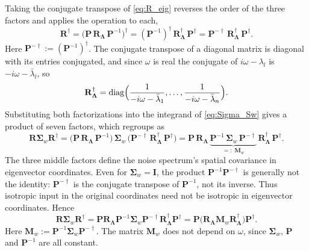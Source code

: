 \documentclass[12pt]{article}
\newcommand{\RL}{\mathbf{R}_{\boldsymbol{\Lambda}}}
\begin{document}
Taking the conjugate transpose of \eqref{eq:R_eig} reverses the order of the three factors and applies the operation to each,
\begin{equation}
    \mathbf{R}^{\dagger}=\bigl(\mathbf{P}\,\RL\,\mathbf{P}^{-1}\bigr)^{\dagger}
    =(\mathbf{P}^{-1})^{\dagger}\,\RL^{\dagger}\,\mathbf{P}^{\dagger}
    =\mathbf{P}^{-\dagger}\,\RL^{\dagger}\,\mathbf{P}^{\dagger}.
    \label{eq:Rdag_eig}
\end{equation}
Here $\mathbf{P}^{-\dagger}:=(\mathbf{P}^{-1})^{\dagger}$.
The conjugate transpose of a diagonal matrix is diagonal with its entries conjugated, and since $\omega$ is real the conjugate of
$i\omega-\lambda_l$ is $-i\omega-\bar\lambda_l$, so
\begin{equation}
    \RL^{\dagger}=\operatorname{diag}\Bigl(\frac{1}{-i\omega-\bar\lambda_1},\dots,\frac{1}{-i\omega-\bar\lambda_n}\Bigr).
    \label{eq:RLdag_eig}
\end{equation}
Substituting both factorizations into the integrand of \eqref{eq:Sigma_Sw} gives a product of seven factors, which regroups as
\begin{equation}
    \mathbf{R}\boldsymbol{\Sigma}_w\mathbf{R}^{\dagger}
    =\bigl(\mathbf{P}\,\RL\,\mathbf{P}^{-1}\bigr)\,\boldsymbol{\Sigma}_w\,\bigl(\mathbf{P}^{-\dagger}\,\RL^{\dagger}\,\mathbf{P}^{\dagger}\bigr)
    =\mathbf{P}\,\RL\,\underbrace{\mathbf{P}^{-1}\,\boldsymbol{\Sigma}_w\,\mathbf{P}^{-\dagger}}_{=:\;\mathbf{M}_w}\,\RL^{\dagger}\,\mathbf{P}^{\dagger} .
    \label{eq:RRdag_regroup}
\end{equation}
The three middle factors define the noise spectrum's spatial covariance in eigenvector coordinates.
Even for $\boldsymbol{\Sigma}_w=\mathbf I$, the product $\mathbf P^{-1}\mathbf P^{-\dagger}$ is generally not the identity:
$\mathbf P^{-\dagger}$ is the conjugate transpose of $\mathbf P^{-1}$, not its inverse.
Thus isotropic input in the original coordinates need not be isotropic in eigenvector coordinates. Hence
\begin{equation}
    \mathbf{R}\boldsymbol{\Sigma}_w\mathbf{R}^{\dagger}
    =\mathbf{P}\RL\mathbf{P}^{-1}\boldsymbol{\Sigma}_w\mathbf{P}^{-\dagger}\RL^{\dagger}\mathbf{P}^{\dagger}
    =\mathbf{P}\bigl(\RL\mathbf{M}_w\RL^{\dagger}\bigr)\mathbf{P}^{\dagger}.
    \label{eq:RRdag_eig}
\end{equation}
Here $\mathbf{M}_w:=\mathbf{P}^{-1}\boldsymbol{\Sigma}_w\mathbf{P}^{-\dagger}$. The matrix $\mathbf{M}_w$ does not depend on $\omega$, since $\boldsymbol{\Sigma}_w$, $\mathbf{P}$ and $\mathbf{P}^{-1}$ are all constant.
\end{document}
